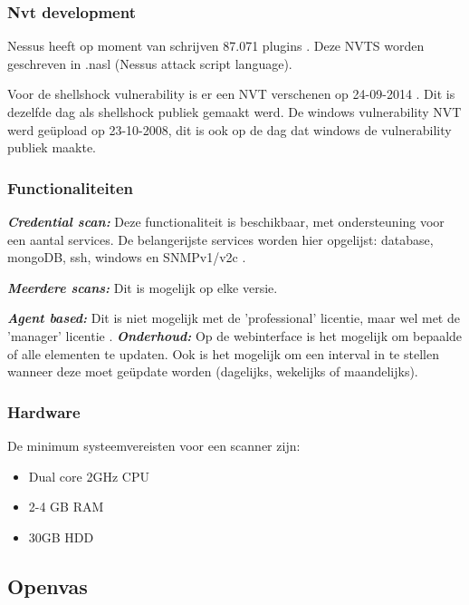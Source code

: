 \subsubsection{Nvt development}
Nessus heeft op moment van schrijven 87.071 plugins \textcite{Nessus-nvt}. Deze NVTS worden geschreven in .nasl (Nessus attack script language).

Voor de shellshock vulnerability is er een NVT verschenen op 24-09-2014 \textcite{Vulners-shellshock-nessus}. Dit is dezelfde dag als shellshock publiek gemaakt werd. De windows vulnerability NVT werd geüpload op 23-10-2008, dit is ook op de dag dat windows de vulnerability publiek maakte.
 

\subsubsection{Functionaliteiten}
\textbf{\textit{Credential scan: }} Deze functionaliteit is beschikbaar, met ondersteuning voor een aantal services. De belangerijste services worden hier opgelijst: database, mongoDB, ssh, windows en SNMPv1/v2c \textcite{Nessus-functions}.

\textbf{\textit{Meerdere scans: }} Dit is mogelijk op elke versie.

\textbf{\textit{Agent based: }} Dit is niet mogelijk met de 'professional' licentie, maar wel met de 'manager' licentie \textcite{Nessus-functions}.
\textbf{\textit{Onderhoud: }} Op de webinterface is het mogelijk om bepaalde of alle  elementen te updaten. Ook is het mogelijk om een interval in te stellen wanneer deze moet geüpdate worden (dagelijks, wekelijks of maandelijks).

\subsubsection{Hardware}
De minimum systeemvereisten voor een scanner zijn:

\begin{itemize}
\item Dual core 2GHz CPU
\item 2-4 GB RAM
\item 30GB HDD
\end{itemize}

\textcite{Nessus-requirements}


\subsection{Openvas}

